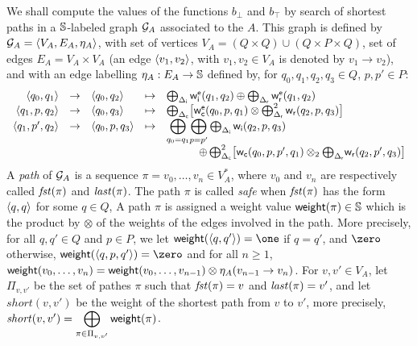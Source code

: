 %

We shall compute the values of the functions $b_\bot$ and $b_\top$
by search of shortest paths in a $\mathbb{S}$-labeled graph $\mathcal{G}_A$
associated to the \SWVPA $A$. 
This graph is defined by $\G_A = \< V_A, E_A, \eta_A >$, 
with set of vertices $V_A = (Q \times Q) \cup (Q \times P \times Q)$,
set of edges $E_A = V_A \times V_A$
(an edge $\< v_1, v_2>$, with $v_1, v_2 \in V_A$ is denoted by $v_1 \to v_2$),
and with an edge labelling  
$\eta_A : E_A \to \mathbb{S}$ defined by, %
for $q_0, q_1, q_2, q_3 \in Q$, $p, p' \in P$:
%
\[
\begin{array}{rclcl}
%
\< q_0, q_1> & \to & \< q_0, q_2> & \mapsto &
\bigoplus_{\Deltai} \weiei(q_1, q_2) \oplus \bigoplus_{\Deltar} \weier(q_1, q_2)\\
%
\< q_1, p, q_2> & \to & \<q_0, q_3> & \mapsto &
\bigoplus_{\Deltac} \bigl[ \weiec(q_0, p, q_1) \otimes \bigoplus^2_{\Deltar} \weir(q_2, p, q_3)\bigr]\\ 
%
%
\< q_1, p', q_2> & \to & \< q_0, p, q_3> & \mapsto &
{\displaystyle\bigoplus_{q_0=q_1}}
{\displaystyle\bigoplus_{p=p'}}
 \bigoplus_{\Deltai} \weii(q_2, p, q_3)\\
 & & & & 
\qquad\quad 
\oplus \bigoplus^2_{\Deltac} \bigl[ \weic(q_0, p, p', q_1) \otimes_2 {\bigoplus_{\Deltar}} \weir(q_2, p', q_3) \bigr]\\
%
\end{array}
\]
%
A \emph{path} of $\mathcal{G}_A$ is a sequence $\pi = v_0,\ldots, v_n \in V^*_A$,
where $v_0$ and $v_n$ are respectively called $\mathit{fst}(\pi)$ and $\mathit{last}(\pi)$.
The path $\pi$ is called \emph{safe} when $\mathit{fst}(\pi)$ has the form $\< q, q>$ for some $q \in Q$, 
%
A path $\pi$ is assigned a weight value $\mathsf{weight}(\pi) \in \mathbb{S}$ which is the product by $\otimes$ 
of the weights of the edges involved in the path.
More precisely, for all $q, q' \in Q$ and $p \in P$, we let 
$\weight(\< q, q' > ) = \one$ if $q = q'$, and $\zero$ otherwise, 
$\weight(\< q, p, q' > ) = \zero$ and 
for all $n \geq 1$, 
$\mathsf{weight}(v_0,\ldots, v_n) = \mathsf{weight}(v_0,\ldots, v_{n-1}) \otimes \eta_A(v_{n-1} \to v_{n})$.
%
For $v, v' \in V_A$,
let $\Pi_{v, v'}$ be the set of pathes $\pi$ such that 
$\mathit{fst}(\pi) = v$ and $\mathit{last}(\pi) = v'$, 
and let $\mathit{short}(v, v')$ be the weight of the shortest path from $v$ to $v'$, 
more precisely, 
\(\mathit{short}(v, v') = \displaystyle\bigoplus_{\pi\in \Pi_{v, v'}} \mathsf{weight}(\pi)\).

